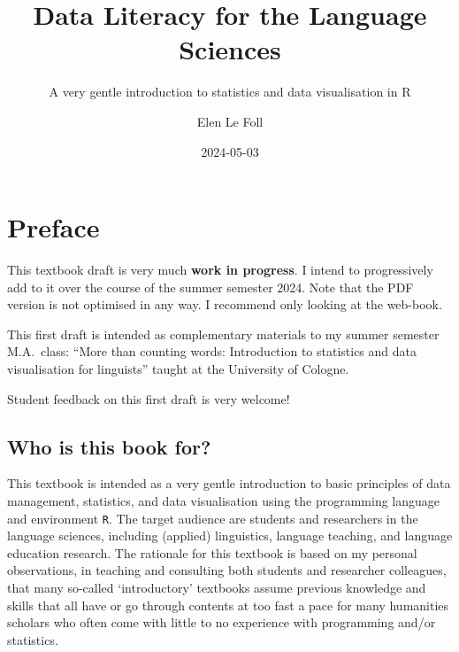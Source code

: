 \documentclass[
  letterpaper,
  DIV=11,
  numbers=noendperiod,
  oneside]{scrreprt}
\title{Data Literacy for the Language Sciences}
\subtitle{A very gentle introduction to statistics and data
visualisation in R}
\author{Elen Le Foll}
\date{2024-05-03}
\renewcommand*\contentsname{Table of contents}
\newcommand\contentsname{Table of contents}
\begin{document}
\maketitle

\renewcommand*\contentsname{Table of contents}
{
\hypersetup{linkcolor=}
\setcounter{tocdepth}{2}
\tableofcontents
}

\chapter*{Preface}\label{preface}


\begin{tcolorbox}[enhanced jigsaw, leftrule=.75mm, arc=.35mm, opacityback=0, rightrule=.15mm, left=2mm, colback=white, title=\textcolor{quarto-callout-warning-color}{\faExclamationTriangle}\hspace{0.5em}{Warning}, colframe=quarto-callout-warning-color-frame, coltitle=black, colbacktitle=quarto-callout-warning-color!10!white, bottomtitle=1mm, toptitle=1mm, titlerule=0mm, bottomrule=.15mm, opacitybacktitle=0.6, breakable, toprule=.15mm]

This textbook draft is very much \textbf{work in progress}. I intend to
progressively add to it over the course of the summer semester 2024.
Note that the PDF version is not optimised in any way. I recommend only
looking at the web-book.

This first draft is intended as complementary materials to my summer
semester M.A.~class: ``More than counting words: Introduction to
statistics and data visualisation for linguists'' taught at the
University of Cologne.

Student feedback on this first draft is very welcome!

\end{tcolorbox}

\section*{Who is this book for?}\label{who-is-this-book-for}


This textbook is intended as a very gentle introduction to basic
principles of data management, statistics, and data visualisation using
the programming language and environment \texttt{R}. The target audience
are students and researchers in the language sciences, including
(applied) linguistics, language teaching, and language education
research. The rationale for this textbook is based on my personal
observations, in teaching and consulting both students and researcher
colleagues, that many so-called `introductory' textbooks assume previous
knowledge and skills that all have or go through contents at too fast a
pace for many humanities scholars who often come with little to no
experience with programming and/or statistics.
\end{document}
